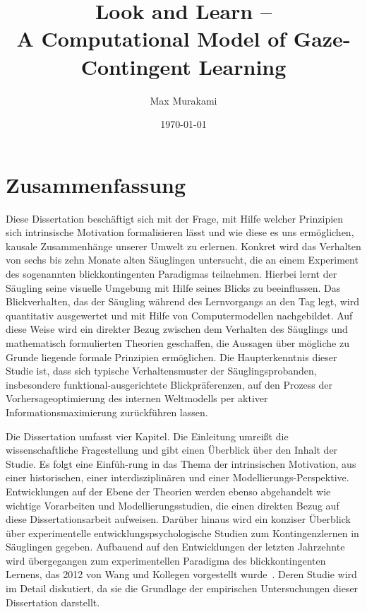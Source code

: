 \documentclass[a4paper]{scrreprt}
\begin{document}



\title{Look and Learn --\\A Computational Model of Gaze-Contingent Learning}
\author{Max Murakami}
\date{\today}

\maketitle

\tableofcontents

\chapter*{Zusammenfassung}

Diese Dissertation besch\"aftigt sich mit der Frage, mit Hilfe welcher Prinzipien sich intrinsische Motivation formalisieren l\"asst und wie diese es uns erm\"oglichen, kausale Zusammenh\"ange unserer Umwelt zu erlernen. Konkret wird das Verhalten von sechs bis zehn Monate alten S\"auglingen untersucht, die an einem Experiment des sogenannten blickkontingenten Paradigmas teilnehmen. Hierbei lernt der S\"augling seine visuelle Umgebung mit Hilfe seines Blicks zu beeinflussen. Das Blickverhalten, das der S\"augling w\"ahrend des Lernvorgangs an den Tag legt, wird quantitativ ausgewertet und mit Hilfe von Computermodellen nachgebildet. Auf diese Weise wird ein direkter Bezug zwischen dem Verhalten des S\"auglings und mathematisch formulierten Theorien geschaffen, die Aussagen \"uber m\"ogliche zu Grunde liegende formale Prinzipien erm\"oglichen. Die Haupterkenntnis dieser Studie ist, dass sich typische Verhaltensmuster der S\"auglingsprobanden, insbesondere funktional-ausgerichtete Blickpr\"aferenzen, auf den Prozess der Vorhersageoptimierung des internen Weltmodells per aktiver Informationsmaximierung zur\"uckf\"uhren lassen.

Die Dissertation umfasst vier Kapitel. Die Einleitung umrei\ss t die wissenschaftliche Fragestellung und gibt einen \"Uberblick \"uber den Inhalt der Studie. Es folgt eine Einf\"uh-rung in das Thema der intrinsischen Motivation, aus einer historischen, einer interdisziplin\"aren und einer Modellierungs-Perspektive. Entwicklungen auf der Ebene der Theorien werden ebenso abgehandelt wie wichtige Vorarbeiten und Modellierungsstudien, die einen direkten Bezug auf diese Dissertationsarbeit aufweisen. Dar\"uber hinaus wird ein konziser \"Uberblick \"uber experimentelle entwicklungspsychologische Studien zum Kontingenzlernen in S\"auglingen gegeben. Aufbauend auf den Entwicklungen der letzten Jahrzehnte wird \"ubergegangen zum experimentellen Paradigma des blickkontingenten Lernens, das 2012 von Wang und Kollegen vorgestellt wurde~\cite{wang12}. Deren Studie wird im Detail diskutiert, da sie die Grundlage der empirischen Untersuchungen dieser Dissertation darstellt.
\end{document}
